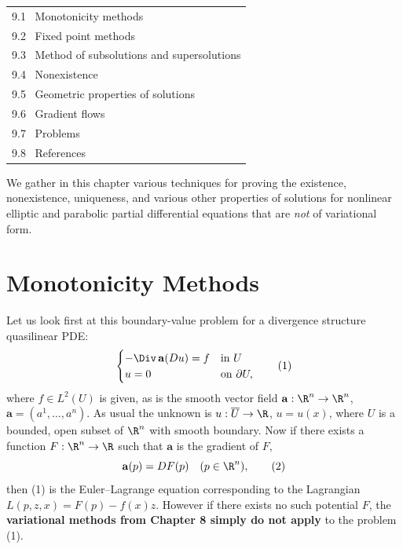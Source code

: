 %


\begin{center}
\begin{tabular}{l}
9.1 \ Monotonicity methods \\
9.2 \ Fixed point methods \\
9.3 \ Method of subsolutions and supersolutions \\
9.4 \ Nonexistence \\
9.5 \ Geometric properties of solutions \\
9.6 \ Gradient flows \\
9.7 \ Problems \\
9.8 \ References
\end{tabular}
\end{center}

We gather in this chapter various techniques for proving the existence, nonexistence, uniqueness, and various other properties of solutions for nonlinear elliptic and parabolic partial differential equations that are \textit{not} of variational form.

\section{Monotonicity Methods}
\label{sec:monotonicity-methods}

Let us look first at this boundary-value problem for a divergence structure quasilinear PDE:
\[
\begin{cases}
-\Div\,\mathbf{a}(Du) = f & \text{in } U \\
u = 0 & \text{on } \partial U,
\end{cases}
\tag{1}
\]
where $f \in L^2(U)$ is given, as is the smooth vector field $\mathbf{a} : \R^n \to \R^n$, $\mathbf{a} = (a^1,\ldots,a^n)$. As usual the unknown is $u : \overline{U} \to \R$, $u = u(x)$, where $U$ is a bounded, open subset of $\R^n$ with smooth boundary. Now if there exists a function $F : \R^n \to \R$ such that $\mathbf{a}$ is the gradient of $F$,
\[
\mathbf{a}(p) = DF(p) \quad (p \in \R^n),
\tag{2}
\]
then (1) is the Euler--Lagrange equation corresponding to the Lagrangian $L(p,z,x) = F(p) - f(x)z$. However if there exists no such potential $F$, the \textbf{variational methods from Chapter 8 simply do not apply} to the problem (1).


